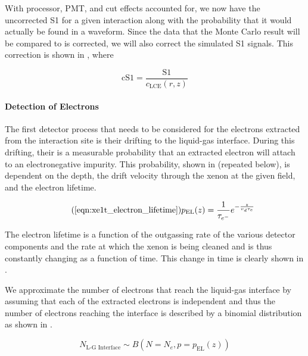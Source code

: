 With processor, PMT, and cut effects accounted for, we now have the uncorrected S1 for a given interaction along with the probability that it would actually be found in a waveform.  Since the data that the Monte Carlo result will be compared to is corrected, we will also correct the simulated S1 signals.  This correction is shown in , where 

\begin{equation}
        \label{eqn:xe1t_s1_recorrect}
        \textrm{cS1} = \frac{\textrm{S1}}{c_{\textrm{LCE}}(r, z)}
\end{equation}




\paragraph{Detection of Electrons}
\label{sec:xe1t_mc_electrons}


The first detector process that needs to be considered for the electrons extracted from the interaction site is their drifting to the liquid-gas interface.  During this drifting, their is a measurable probability that an extracted electron will attach to an electronegative impurity.  This probability, shown in  (repeated below), is dependent on the depth, the drift velocity through the xenon at the given field, and the electron lifetime.   

\begin{equation}
        \tag{\ref{eqn:xe1t_electron_lifetime}}
        p_{\textrm{EL}}(z) = \frac{1}{\tau_{e^-}} e^{-\frac{z}{v_d \tau_{e}}}
\end{equation} 


The electron lifetime is a function of the outgassing rate of the various detector components and the rate at which the xenon is being cleaned and is thus constantly changing as a function of time.  This change in time is clearly shown in .

We approximate the number of electrons that reach the liquid-gas interface by assuming that each of the extracted electrons is independent and thus the number of electrons reaching the interface is described by a binomial distribution as shown in .


\begin{equation}
        \label{eqn:xe1t_binomial_el}
        N_{\textrm{L-G Interface}} \sim B \left( N=N_e, p=p_{\textrm{EL}}(z) \right)
\end{equation}


